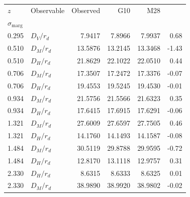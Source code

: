 {\footnotesize\setlength{\tabcolsep}{3pt}
\begin{tabular}{llrrrr}
\toprule
$z$ & Observable & Observed & G10 & M28 & \shortstack{$(D_{\mathrm{model}}-D_{\mathrm{obs}})/$\\$\sigma_{\mathrm{marg}}$} \\
\midrule
0.295 & $D_V/r_d$ & 7.9417 & 7.8966 & 7.9937 & 0.68 \\
0.510 & $D_M/r_d$ & 13.5876 & 13.2145 & 13.3468 & -1.43 \\
0.510 & $D_H/r_d$ & 21.8629 & 22.1022 & 22.0510 & 0.44 \\
0.706 & $D_M/r_d$ & 17.3507 & 17.2472 & 17.3376 & -0.07 \\
0.706 & $D_H/r_d$ & 19.4553 & 19.5245 & 19.4530 & -0.01 \\
0.934 & $D_M/r_d$ & 21.5756 & 21.5566 & 21.6323 & 0.35 \\
0.934 & $D_H/r_d$ & 17.6415 & 17.6915 & 17.6291 & -0.06 \\
1.321 & $D_M/r_d$ & 27.6009 & 27.6597 & 27.7505 & 0.46 \\
1.321 & $D_H/r_d$ & 14.1760 & 14.1493 & 14.1587 & -0.08 \\
1.484 & $D_M/r_d$ & 30.5119 & 29.8788 & 29.9595 & -0.72 \\
1.484 & $D_H/r_d$ & 12.8170 & 13.1118 & 12.9757 & 0.31 \\
2.330 & $D_H/r_d$ & 8.6315 & 8.6333 & 8.6325 & 0.01 \\
2.330 & $D_M/r_d$ & 38.9890 & 38.9920 & 38.9802 & -0.02 \\
\bottomrule
\end{tabular}}
